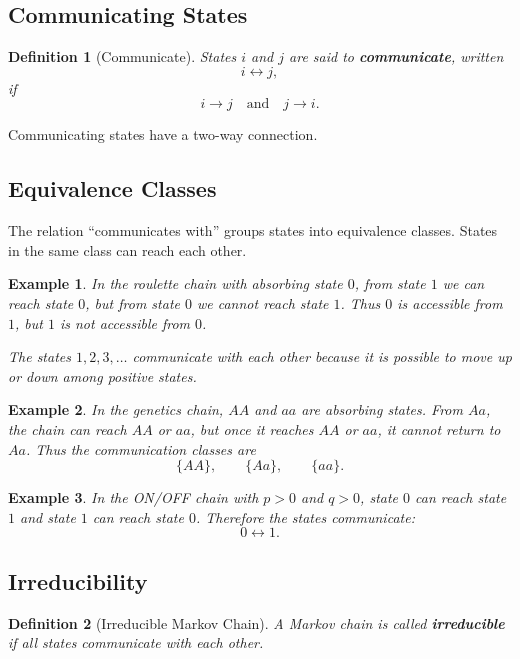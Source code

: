 \documentclass[12pt,a4paper]{article}
\theoremstyle{lecturestyle}
\newtheorem{definition}{Definition}
\newtheorem{example}{Example}
\begin{document}
\subsection{Communicating States}

\begin{definition}[Communicate]
States $i$ and $j$ are said to \textbf{communicate}, written
\[
i\leftrightarrow j,
\]
if
\[
i\to j
\quad\text{and}\quad
j\to i.
\]
\end{definition}

Communicating states have a two-way connection.

\subsection{Equivalence Classes}

The relation ``communicates with'' groups states into equivalence classes. States in the same class can reach each other.

\begin{example}
In the roulette chain with absorbing state $0$, from state $1$ we can reach state $0$, but from state $0$ we cannot reach state $1$. Thus $0$ is accessible from $1$, but $1$ is not accessible from $0$.

The states $1,2,3,\ldots$ communicate with each other because it is possible to move up or down among positive states.
\end{example}

\begin{example}
In the genetics chain, $AA$ and $aa$ are absorbing states. From $Aa$, the chain can reach $AA$ or $aa$, but once it reaches $AA$ or $aa$, it cannot return to $Aa$. Thus the communication classes are
\[
\{AA\},\qquad \{Aa\},\qquad \{aa\}.
\]
\end{example}

\begin{example}
In the ON/OFF chain with $p>0$ and $q>0$, state $0$ can reach state $1$ and state $1$ can reach state $0$. Therefore the states communicate:
\[
0\leftrightarrow 1.
\]
\end{example}

\subsection{Irreducibility}

\begin{definition}[Irreducible Markov Chain]
A Markov chain is called \textbf{irreducible} if all states communicate with each other.
\end{definition}
\end{document}
